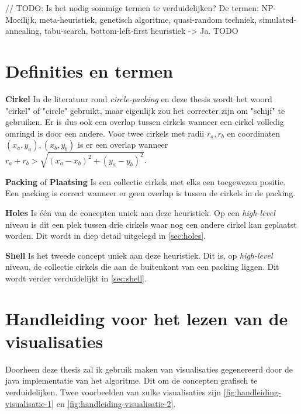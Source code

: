 \documentclass[12pt,a4paper,oneside]{book}
\begin{document}
// TODO: Is het nodig sommige termen te verduidelijken? De termen: NP-Moeilijk, meta-heuristiek, genetisch algoritme, quasi-random techniek, simulated-annealing, tabu-search, bottom-left-first heuristiek -> Ja. TODO

\chapter{Definities en termen} \label{chap:definities}

\textbf{Cirkel} In de literatuur rond \textit{circle-packing} en deze thesis wordt het woord "cirkel" of "circle" gebruikt, maar eigenlijk zou het correcter zijn om "schijf" te gebruiken.
Er is dus ook een overlap tussen cirkels wanneer een cirkel volledig omringd is door een andere.
Voor twee cirkels met radii $r_a, r_b$ en coordinaten  $(x_a,y_a), (x_b,y_b)$ is er een overlap wanneer $r_a + r_b > \sqrt{(x_a-x_b)^2 + (y_a-y_b)^2}$. 

\textbf{Packing} of \textbf{Plaatsing} Is een collectie cirkels met elks een toegewezen positie. Een packing is correct wanneer er geen overlap is tussen de cirkels in de packing.

\textbf{Holes} Is één van de concepten uniek aan deze heuristiek. Op een \textit{high-level} niveau is dit een plek tussen drie cirkels waar nog een andere cirkel kan geplaatst worden. Dit wordt in diep detail uitgelegd in \autoref{sec:holes}.

\textbf{Shell} Is het tweede concept uniek aan deze heuristiek. Dit is, op \textit{high-level} niveau, de collectie cirkels die aan de buitenkant van een packing liggen. Dit wordt verder verduidelijkt in \autoref{sec:shell}.

\chapter{Handleiding voor het lezen van de visualisaties} \label{chap:handleiding-visualisaties}

Doorheen deze thesis zal ik gebruik maken van visualisaties gegenereerd door de java implementatie van het algoritme.
Dit om de concepten grafisch te verduidelijken.
Twee voorbeelden van zulke visualisaties zijn \autoref{fig:handleiding-visualisatie-1} en \autoref{fig:handleiding-visualisatie-2}.
\end{document}
